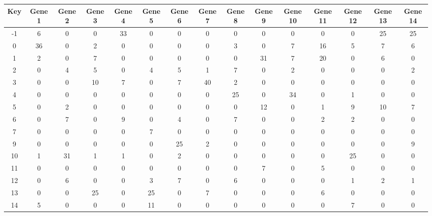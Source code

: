 \begin{tabular}{|c|c|c|c|c|c|c|c|c|c|c|c|c|c|c|}
\hline
Key & Gene 1 & Gene 2 & Gene 3 & Gene 4 & Gene 5 & Gene 6 & Gene 7 & Gene 8 & Gene 9 & Gene 10 & Gene 11 & Gene 12 & Gene 13 & Gene 14 \\
\hline
-1 & 6 & 0 & 0 & 33 & 0 & 0 & 0 & 0 & 0 & 0 & 0 & 0 & 25 & 25 \\
0 & 36 & 0 & 2 & 0 & 0 & 0 & 0 & 3 & 0 & 7 & 16 & 5 & 7 & 6 \\
1 & 2 & 0 & 7 & 0 & 0 & 0 & 0 & 0 & 31 & 7 & 20 & 0 & 6 & 0 \\
2 & 0 & 4 & 5 & 0 & 4 & 5 & 1 & 7 & 0 & 2 & 0 & 0 & 0 & 2 \\
3 & 0 & 0 & 10 & 7 & 0 & 7 & 40 & 2 & 0 & 0 & 0 & 0 & 0 & 0 \\
4 & 0 & 0 & 0 & 0 & 0 & 0 & 0 & 25 & 0 & 34 & 0 & 1 & 0 & 0 \\
5 & 0 & 2 & 0 & 0 & 0 & 0 & 0 & 0 & 12 & 0 & 1 & 9 & 10 & 7 \\
6 & 0 & 7 & 0 & 9 & 0 & 4 & 0 & 7 & 0 & 0 & 2 & 2 & 0 & 0 \\
7 & 0 & 0 & 0 & 0 & 7 & 0 & 0 & 0 & 0 & 0 & 0 & 0 & 0 & 0 \\
9 & 0 & 0 & 0 & 0 & 0 & 25 & 2 & 0 & 0 & 0 & 0 & 0 & 0 & 9 \\
10 & 1 & 31 & 1 & 1 & 0 & 2 & 0 & 0 & 0 & 0 & 0 & 25 & 0 & 0 \\
11 & 0 & 0 & 0 & 0 & 0 & 0 & 0 & 0 & 7 & 0 & 5 & 0 & 0 & 0 \\
12 & 0 & 6 & 0 & 0 & 3 & 7 & 0 & 6 & 0 & 0 & 0 & 1 & 2 & 1 \\
13 & 0 & 0 & 25 & 0 & 25 & 0 & 7 & 0 & 0 & 0 & 6 & 0 & 0 & 0 \\
14 & 5 & 0 & 0 & 0 & 11 & 0 & 0 & 0 & 0 & 0 & 0 & 7 & 0 & 0 \\
\hline
\end{tabular}